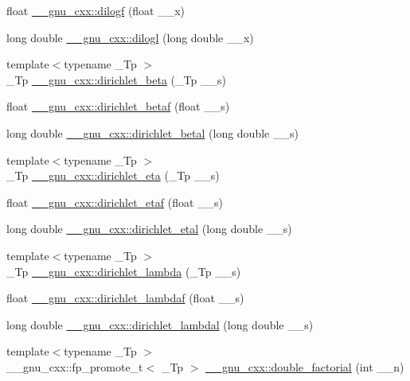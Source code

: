 \begin{DoxyCompactItemize}
\item 
float \hyperlink{group__gnu__math__spec__func_ga901091e0e7ce7d6113ae6a86f4865a92}{\+\_\+\+\_\+gnu\+\_\+cxx\+::dilogf} (float \+\_\+\+\_\+x)
\item 
long double \hyperlink{group__gnu__math__spec__func_gae90c13ee690ebaf10a18a900fe2646f9}{\+\_\+\+\_\+gnu\+\_\+cxx\+::dilogl} (long double \+\_\+\+\_\+x)
\item 
{\footnotesize template$<$typename \+\_\+\+Tp $>$ }\\\+\_\+\+Tp \hyperlink{group__gnu__math__spec__func_ga87466a2d429a2815d794acc21c882b08}{\+\_\+\+\_\+gnu\+\_\+cxx\+::dirichlet\+\_\+beta} (\+\_\+\+Tp \+\_\+\+\_\+s)
\item 
float \hyperlink{group__gnu__math__spec__func_ga9bb40e20b18e3eb822e70af955940830}{\+\_\+\+\_\+gnu\+\_\+cxx\+::dirichlet\+\_\+betaf} (float \+\_\+\+\_\+s)
\item 
long double \hyperlink{group__gnu__math__spec__func_gaed6fd85a4577f4de66d74742a1850a13}{\+\_\+\+\_\+gnu\+\_\+cxx\+::dirichlet\+\_\+betal} (long double \+\_\+\+\_\+s)
\item 
{\footnotesize template$<$typename \+\_\+\+Tp $>$ }\\\+\_\+\+Tp \hyperlink{group__gnu__math__spec__func_gae46e26e4107675d285c79a2d6202e6c7}{\+\_\+\+\_\+gnu\+\_\+cxx\+::dirichlet\+\_\+eta} (\+\_\+\+Tp \+\_\+\+\_\+s)
\item 
float \hyperlink{group__gnu__math__spec__func_ga6f05d076600b1de9193e586cf89547c9}{\+\_\+\+\_\+gnu\+\_\+cxx\+::dirichlet\+\_\+etaf} (float \+\_\+\+\_\+s)
\item 
long double \hyperlink{group__gnu__math__spec__func_ga408e2267b648f29445522dbafb7a0e1a}{\+\_\+\+\_\+gnu\+\_\+cxx\+::dirichlet\+\_\+etal} (long double \+\_\+\+\_\+s)
\item 
{\footnotesize template$<$typename \+\_\+\+Tp $>$ }\\\+\_\+\+Tp \hyperlink{group__gnu__math__spec__func_ga06842a81bdcabf9c62252dde992d42ee}{\+\_\+\+\_\+gnu\+\_\+cxx\+::dirichlet\+\_\+lambda} (\+\_\+\+Tp \+\_\+\+\_\+s)
\item 
float \hyperlink{group__gnu__math__spec__func_gaafd3ca6b0d71d55d3835536396eece8f}{\+\_\+\+\_\+gnu\+\_\+cxx\+::dirichlet\+\_\+lambdaf} (float \+\_\+\+\_\+s)
\item 
long double \hyperlink{group__gnu__math__spec__func_gab28d06c4e3c7457f1fa3663168678fb2}{\+\_\+\+\_\+gnu\+\_\+cxx\+::dirichlet\+\_\+lambdal} (long double \+\_\+\+\_\+s)
\item 
{\footnotesize template$<$typename \+\_\+\+Tp $>$ }\\\+\_\+\+\_\+gnu\+\_\+cxx\+::fp\+\_\+promote\+\_\+t$<$ \+\_\+\+Tp $>$ \hyperlink{group__gnu__math__spec__func_ga1e62c47f84f9782828f8830b4fedc13c}{\+\_\+\+\_\+gnu\+\_\+cxx\+::double\+\_\+factorial} (int \+\_\+\+\_\+n)

\end{DoxyCompactItemize}
